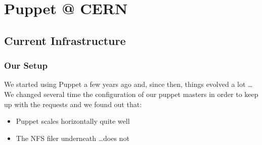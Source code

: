 \documentclass[aspectratio=169]{beamer}
\begin{document}
\section{Puppet @ CERN}

\subsection{Current Infrastructure}
\begin{frame}
    \frametitle{Our Setup}
    We started using Puppet a few years ago and, since then, things evolved a lot \ldots \\
    \vspace{1em}
    We changed several time the configuration of our puppet masters in order to keep up with the requests and we found out that:

    \begin{itemize}
        \item Puppet scales horizontally quite well
        \item The NFS filer underneath \ldots does not
    \end{itemize}
\end{frame}

\end{document}
